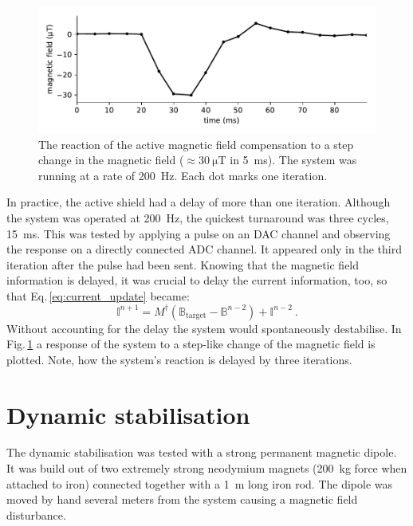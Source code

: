 \begin{figure}
  \centering
  \includegraphics[width=.9\linewidth]{gfx/prototype/SFC_step_response.pdf}
  \caption{The reaction of the active magnetic field compensation to a step change in the magnetic field ($\approx \SI{30}{\micro\tesla}$ in \SI{5}{\milli\second}). The system was running at a rate of \SI{200}{\hertz}. Each dot marks one iteration.}\label{fig:prototype_step_response}
\end{figure}

In practice, the active shield had a delay of more than one iteration. Although the system was operated at \SI{200}{\hertz}, the quickest turnaround was three cycles, \SI{15}{\milli\second}. This was tested by applying a pulse on an DAC channel and observing the response on a directly connected ADC channel. It appeared only in the third iteration after the pulse had been sent. Knowing that the magnetic field information is delayed, it was crucial to delay the current information, too, so that Eq.\,\ref{eq:current_update} became:
\begin{equation}
  \mathbb{I}^{n+1} = M^\dagger \left( \mathbb{B}_\text{target} - \mathbb{B}^{n-2} \right) + \mathbb{I}^{n-2} \ .
\end{equation}
Without accounting for the delay the system would spontaneously destabilise. In Fig.\,\ref{fig:prototype_step_response} a response of the system to a step-like change of the magnetic field is plotted. Note, how the system's reaction is delayed by three iterations.






\section{Dynamic stabilisation}
\label{sec:dynamic_stabilisation}
The dynamic stabilisation was tested with a strong permanent magnetic dipole. It was build out of two extremely strong neodymium magnets (\SI{200}{\kilo\gram} force when attached to iron) connected together with a \SI{1}{\metre} long iron rod. The dipole was moved by hand several meters from the system causing a magnetic field disturbance.

